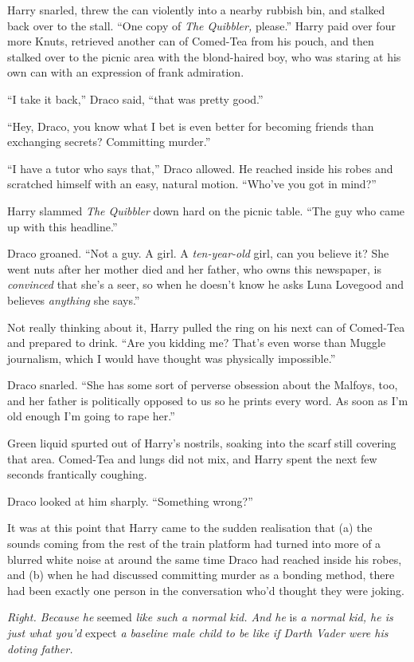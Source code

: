 Harry snarled, threw the can violently into a nearby rubbish bin, and
stalked back over to the stall. ``One copy of \emph{The Quibbler,}
please.'' Harry paid over four more Knuts, retrieved another can of
Comed-Tea from his pouch, and then stalked over to the picnic area with
the blond-haired boy, who was staring at his own can with an expression
of frank admiration.

``I take it back,'' Draco said, ``that was pretty good.''

``Hey, Draco, you know what I bet is even better for becoming friends
than exchanging secrets? Committing murder.''

``I have a tutor who says that,'' Draco allowed. He reached inside his
robes and scratched himself with an easy, natural motion. ``Who've you
got in mind?''

Harry slammed \emph{The Quibbler} down hard on the picnic table. ``The
guy who came up with this headline.''

Draco groaned. ``Not a guy. A girl. A \emph{ten-year-old} girl, can you
believe it? She went nuts after her mother died and her father, who owns
this newspaper, is \emph{convinced} that she's a seer, so when he
doesn't know he asks Luna Lovegood and believes \emph{anything} she
says.''

Not really thinking about it, Harry pulled the ring on his next can of
Comed-Tea and prepared to drink. ``Are you kidding me? That's even worse
than Muggle journalism, which I would have thought was physically
impossible.''

Draco snarled. ``She has some sort of perverse obsession about the
Malfoys, too, and her father is politically opposed to us so he prints
every word. As soon as I'm old enough I'm going to rape her.''

Green liquid spurted out of Harry's nostrils, soaking into the scarf
still covering that area. Comed-Tea and lungs did not mix, and Harry
spent the next few seconds frantically coughing.

Draco looked at him sharply. ``Something wrong?''

It was at this point that Harry came to the sudden realisation that (a)
the sounds coming from the rest of the train platform had turned into
more of a blurred white noise at around the same time Draco had reached
inside his robes, and (b) when he had discussed committing murder as a
bonding method, there had been exactly one person in the conversation
who'd thought they were joking.

\emph{Right. Because he} seemed \emph{like such a normal kid. And he} is
\emph{a normal kid, he is just what you'd} expect \emph{a baseline male
child to be like if Darth Vader were his doting father.}

